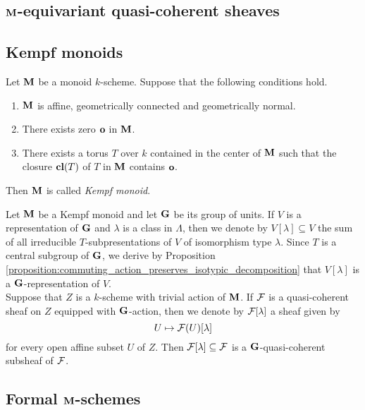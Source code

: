 \subsection{$\mathbf{M}$-equivariant quasi-coherent sheaves}

\subsection{Kempf monoids}

\begin{definition}
Let $\mathbf{M}$ be a monoid $k$-scheme. Suppose that the following conditions hold.
\begin{enumerate}[label=\textbf{(\arabic*)}, leftmargin=1.5em]
\item $\mathbf{M}$ is affine, geometrically connected and geometrically normal.
\item There exists zero $\mathbf{o}$ in $\mathbf{M}$.
\item There exists a torus $T$ over $k$ contained in the center of $\mathbf{M}$ such that the closure $\mathbf{cl}(T)$ of $T$ in $\mathbf{M}$ contains $\mathbf{o}$.
\end{enumerate}
Then $\mathbf{M}$ is called \textit{Kempf  monoid}.
\end{definition}
\noindent
Let $\mathbf{M}$ be a Kempf monoid and let $\mathbf{G}$ be its group of units. If $V$ is a representation of $\mathbf{G}$ and $\lambda$ is a class in $\Lambda$, then we denote by $V[\lambda]\subseteq V$ the sum of all irreducible $T$-subpresentations of $V$ of isomorphism type $\lambda$. Since $T$ is a central subgroup of $\mathbf{G}$, we derive by Proposition \ref{proposition:commuting_action_preserves_isotypic_decomposition} that $V[\lambda]$ is a $\mathbf{G}$-representation of $V$.\\
Suppose that $Z$ is a $k$-scheme with trivial action of $\mathbf{M}$. If ${\mathcal F}$ is a quasi-coherent sheaf on $Z$ equipped with $\mathbf{G}$-action, then we denote by ${\mathcal F}[\lambda]$ a sheaf given by
$$U\mapsto {\mathcal F}(U)[\lambda]$$
for every open affine subset $U$ of $Z$. Then ${\mathcal F}[\lambda]\subseteq {\mathcal F}$ is a $\mathbf{G}$-quasi-coherent subsheaf of ${\mathcal F}$.

\subsection{Formal $\mathbf{M}$-schemes}

